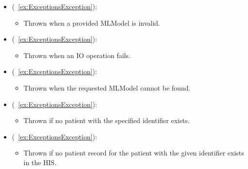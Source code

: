 \begin{itemize}[nolistsep,noitemsep]
\item {} (\iconinher{}~\ref{ex:ExceptionsException}): 
\begin{itemize}[noitemsep,nolistsep]

\item[] Thrown when a provided MLModel is invalid.
\end{itemize}

\item {} (\iconinher{}~\ref{ex:ExceptionsException}): 
\begin{itemize}[noitemsep,nolistsep]

\item[] Thrown when an IO operation fails.
\end{itemize}

\item {} (\iconinher{}~\ref{ex:ExceptionsException}): 
\begin{itemize}[noitemsep,nolistsep]

\item[] Thrown when the requested MLModel cannot be found.
\end{itemize}

\item {} (\iconinher{}~\ref{ex:ExceptionsException}): 
\begin{itemize}[noitemsep,nolistsep]

\item[] Thrown if no patient with the specified identifier exists.
\end{itemize}

\item {} (\iconinher{}~\ref{ex:ExceptionsException}): 
\begin{itemize}[noitemsep,nolistsep]

\item[] Thrown if no patient record for the patient with the given identifier exists in the HIS.
\end{itemize}

\end{itemize}

